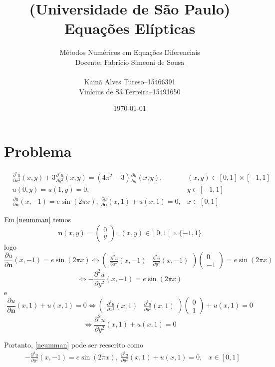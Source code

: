 \documentclass{article}
\title{(Universidade de São Paulo)\\
Equações Elípticas}
\author{Métodos Numéricos em Equações Diferenciais\\
Docente: Fabrício Simeoni de Sousa\\[.2cm]
\begin{tabular}{r@{\ }c@{\ }l}
    Kainã Alves Tureso      &-- &15466391\\
    Vinícius de Sá Ferreira &-- &15491650
\end{tabular}}
\date{\today}
\begin{document}
    \maketitle
    
    \section{Problema}
    \begin{align}
        &\frac{\partial^2 u}{\partial x^2}(x,y) + 3\frac{\partial^2 u}{\partial y^2}(x,y) = (4\pi^2-3)\frac{\partial u}{\partial y}(x,y),& (x,y) \in [0,1] \times [-1,1] \label{eq}\\
        &u(0,y)=u(1,y)=0,& y \in [-1,1] \label{dirichlet}\\
        &\frac{\partial u}{\partial \mathbf{n}}(x,-1) = e \sin(2\pi x),\ \frac{\partial u }{\partial \mathbf{n}}(x,1) + u(x,1) = 0,& x \in [0,1] \label{neumman}
    \end{align}

    Em \ref{neumman} temos
    \[\mathbf{n}(x,y) = \begin{pmatrix}0 \\ y\end{pmatrix},\ (x,y) \in [0,1] \times \{-1,1\}\]
    logo
    \[\frac{\partial u}{\partial \mathbf{n}}(x,-1) = e \sin(2\pi x) \iff
    \begin{pmatrix}\frac{\partial^2 u}{\partial x^2}(x,-1) & \frac{\partial^2 u}{\partial y^2}(x,-1)\end{pmatrix} \begin{pmatrix}0 \\ -1\end{pmatrix} = e \sin(2\pi x)\]
    \[\iff -\frac{\partial^2 u}{\partial y^2}(x,-1) = e \sin(2\pi x)\]
    e
    \[\frac{\partial u }{\partial \mathbf{n}}(x,1) + u(x,1) = 0 \iff
    \begin{pmatrix}\frac{\partial^2 u}{\partial x^2}(x,1) & \frac{\partial^2 u}{\partial y^2}(x,1)\end{pmatrix} \begin{pmatrix}0 \\ 1\end{pmatrix} + u(x,1) = 0\]
    \[\iff \frac{\partial^2 u}{\partial y^2}(x,1) + u(x,1) = 0\]

    Portanto, \ref{neumman} pode ser reescrito como
    \begin{align}
        &-\frac{\partial^2 u}{\partial y^2}(x,-1) = e \sin(2\pi x),\ \frac{\partial^2 u}{\partial y^2}(x,1) + u(x,1) = 0,& x \in [0,1] \label{neumman_remake}
    \end{align}
\end{document}
